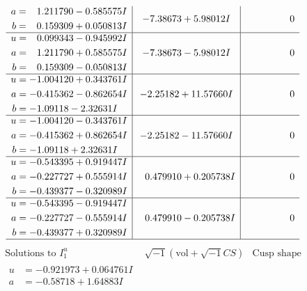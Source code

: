 \documentclass[1p]{elsarticle_modified}
\theoremstyle{definition}
\newcommand{\I}{\sqrt{-1}}
\begin{document}
$$\begin{array}{c|c|c}
\begin{aligned}
a &= \phantom{-}1.211790 - 0.585575 I \\
b &= \phantom{-}0.159309 + 0.050813 I\end{aligned}
 & -7.38673 + 5.98012 I & \phantom{-0.000000 } 0 \\ \hline\begin{aligned}
u &= \phantom{-}0.099343 - 0.945992 I \\
a &= \phantom{-}1.211790 + 0.585575 I \\
b &= \phantom{-}0.159309 - 0.050813 I\end{aligned}
 & -7.38673 - 5.98012 I & \phantom{-0.000000 } 0 \\ \hline\begin{aligned}
u &= -1.004120 + 0.343761 I \\
a &= -0.415362 - 0.862654 I \\
b &= -1.09118 - 2.32631 I\end{aligned}
 & -2.25182 + 11.57660 I & \phantom{-0.000000 } 0 \\ \hline\begin{aligned}
u &= -1.004120 - 0.343761 I \\
a &= -0.415362 + 0.862654 I \\
b &= -1.09118 + 2.32631 I\end{aligned}
 & -2.25182 - 11.57660 I & \phantom{-0.000000 } 0 \\ \hline\begin{aligned}
u &= -0.543395 + 0.919447 I \\
a &= -0.227727 + 0.555914 I \\
b &= -0.439377 - 0.320989 I\end{aligned}
 & \phantom{-}0.479910 + 0.205738 I & \phantom{-0.000000 } 0 \\ \hline\begin{aligned}
u &= -0.543395 - 0.919447 I \\
a &= -0.227727 - 0.555914 I \\
b &= -0.439377 + 0.320989 I\end{aligned}
 & \phantom{-}0.479910 - 0.205738 I & \phantom{-0.000000 } 0\\
 \hline 
 \end{array}$$\newpage$$\begin{array}{c|c|c}  
\text{Solutions to }I^u_{1}& \I (\text{vol} + \sqrt{-1}CS) & \text{Cusp shape}\\
 \hline 
\begin{aligned}
u &= -0.921973 + 0.064761 I \\
a &= -0.58718 + 1.64883 I \\

\end{aligned}
\end{array}$$
\end{document}
